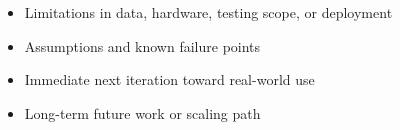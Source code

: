 
\begin{itemize}
  \item Limitations in data, hardware, testing scope, or deployment
  \item Assumptions and known failure points
  \item Immediate next iteration toward real-world use
  \item Long-term future work or scaling path
\end{itemize}
